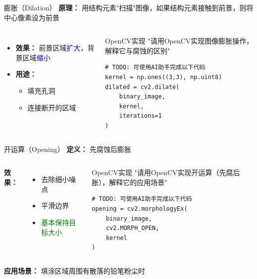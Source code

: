 \begin{frame}{膨胀（Dilation）}
    \textbf{原理：} 用结构元素"扫描"图像，如果结构元素接触到前景，则将中心像素设为前景

    \vspace{0.3cm}

    \begin{columns}
        \begin{itemize}
            \item \textbf{效果：} 前景区域\textcolor{blue}{扩大}，背景区域\textcolor{blue}{缩小}
            \item \textbf{用途：}
                \begin{itemize}
                    \item 填充孔洞
                    \item 连接断开的区域
                \end{itemize}
        \end{itemize}

        \begin{block}{OpenCV实现}
        \aihint{} "请用OpenCV实现图像膨胀操作，解释它与腐蚀的区别"
        \begin{lstlisting}
# TODO: 可使用AI助手完成以下代码
kernel = np.ones((3,3), np.uint8)
dilated = cv2.dilate(
    binary_image,
    kernel,
    iterations=1
)
        \end{lstlisting}
        \end{block}
    \end{columns}
\end{frame}

\begin{frame}{开运算（Opening）}
    \textbf{定义：} 先腐蚀后膨胀

    \vspace{0.3cm}

    \begin{columns}
        \textbf{效果：}
        \begin{itemize}
            \item 去除细小噪点
            \item 平滑边界
            \item \textcolor{green}{基本保持目标大小}
        \end{itemize}

        \begin{block}{OpenCV实现}
        \aihint{} "请用OpenCV实现开运算（先腐后胀），解释它的应用场景"
        \begin{lstlisting}
# TODO: 可使用AI助手完成以下代码
opening = cv2.morphologyEx(
    binary_image,
    cv2.MORPH_OPEN,
    kernel
)
        \end{lstlisting}
        \end{block}
    \end{columns}

    \vspace{0.3cm}

    \textbf{应用场景：} 填涂区域周围有散落的铅笔粉尘时
\end{frame}

